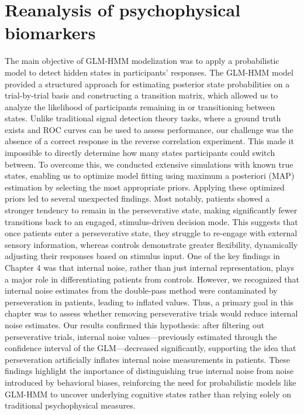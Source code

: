 \renewcommand{\chaptername}{Chapter} 
\chapter{Reanalysis of psychophysical biomarkers}\label{chap8}
The main objective of GLM-HMM modelization was to apply a probabilistic model to detect hidden states in participants' responses. The GLM-HMM model provided a structured approach for estimating posterior state probabilities on a trial-by-trial basis and constructing a transition matrix, which allowed us to analyze the likelihood of participants remaining in or transitioning between states. Unlike traditional signal detection theory tasks, where a ground truth exists and ROC curves can be used to assess performance, our challenge was the absence of a correct response in the reverse correlation experiment. This made it impossible to directly determine how many states participants could switch between. To overcome this, we conducted extensive simulations with known true states, enabling us to optimize model fitting using maximum a posteriori (MAP) estimation by selecting the most appropriate priors.\newline
Applying these optimized priors led to several unexpected findings. Most notably, patients showed a stronger tendency to remain in the perseverative state, making significantly fewer transitions back to an engaged, stimulus-driven decision mode. This suggests that once patients enter a perseverative state, they struggle to re-engage with external sensory information, whereas controls demonstrate greater flexibility, dynamically adjusting their responses based on stimulus input.\newline
One of the key findings in Chapter 4 was that internal noise, rather than just internal representation, plays a major role in differentiating patients from controls. However, we recognized that internal noise estimates from the double-pass method were contaminated by perseveration in patients, leading to inflated values. Thus, a primary goal in this chapter was to assess whether removing perseverative trials would reduce internal noise estimates. Our results confirmed this hypothesis: after filtering out perseverative trials, internal noise values—previously estimated through the confidence interval of the GLM—decreased significantly, supporting the idea that perseveration artificially inflates internal noise measurements in patients.\newline
These findings highlight the importance of distinguishing true internal noise from noise introduced by behavioral biases, reinforcing the need for probabilistic models like GLM-HMM to uncover underlying cognitive states rather than relying solely on traditional psychophysical measures.

